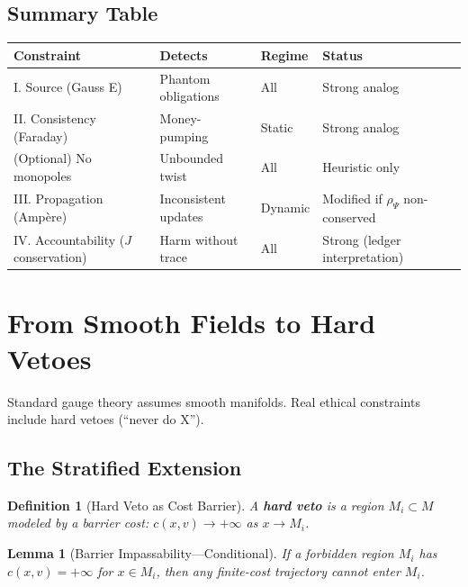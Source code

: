 \documentclass[12pt]{article}
\newtheorem{lemma}[theorem]{Lemma}
\newtheorem{definition}[theorem]{Definition}
\begin{document}
\subsection{Summary Table}

\begin{table}[h]
\centering
\begin{tabular}{lllll}
\toprule
\textbf{Constraint} & \textbf{Detects} & \textbf{Regime} & \textbf{Status} \\
\midrule
I. Source (Gauss E) & Phantom obligations & All & Strong analog \\
II. Consistency (Faraday) & Money-pumping & Static & Strong analog \\
(Optional) No monopoles & Unbounded twist & All & Heuristic only \\
III. Propagation (Amp\`{e}re) & Inconsistent updates & Dynamic & Modified if $\rho_\Psi$ non-conserved \\
IV. Accountability ($J$ conservation) & Harm without trace & All & Strong (ledger interpretation) \\
\bottomrule
\end{tabular}
\end{table}

\section{From Smooth Fields to Hard Vetoes}

Standard gauge theory assumes smooth manifolds. Real ethical constraints include hard vetoes
(``never do X'').

\subsection{The Stratified Extension}

\begin{definition}[Hard Veto as Cost Barrier]
\emph{A \textbf{hard veto} is a region $M_i \subset M$ modeled by a barrier
cost: $c(x, v) \to +\infty$ as $x \to M_i$.}
\end{definition}

\begin{lemma}[Barrier Impassability---Conditional]
\emph{If a forbidden region $M_i$ has $c(x, v) = +\infty$ for
$x \in M_i$, then any finite-cost trajectory cannot enter $M_i$.}
\end{lemma}
\end{document}
